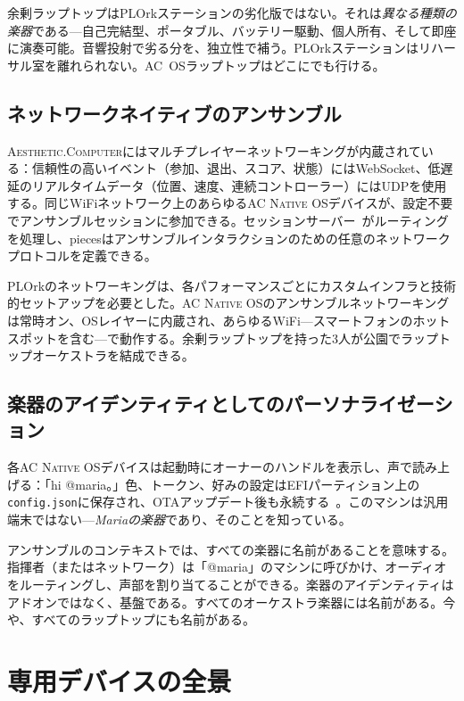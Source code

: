 \documentclass[10pt,letterpaper,twocolumn]{article}
\newcommand{\ac}{\textsc{Aesthetic.Computer}}
\newcommand{\acos}{\textsc{AC Native OS}}
\begin{document}
余剰ラップトップはPLOrkステーションの劣化版ではない。それは\emph{異なる種類の楽器}である---自己完結型、ポータブル、バッテリー駆動、個人所有、そして即座に演奏可能。音響投射で劣る分を、独立性で補う。PLOrkステーションはリハーサル室を離れられない。AC~OSラップトップはどこにでも行ける。

\subsection{ネットワークネイティブのアンサンブル}

\ac{}にはマルチプレイヤーネットワーキングが内蔵されている：信頼性の高いイベント（参加、退出、スコア、状態）にはWebSocket、低遅延のリアルタイムデータ（位置、速度、連続コントローラー）にはUDPを使用する。同じWiFiネットワーク上のあらゆる\acos{}デバイスが、設定不要でアンサンブルセッションに参加できる。セッションサーバー~\citep{scudder2026ac}がルーティングを処理し、piecesはアンサンブルインタラクションのための任意のネットワークプロトコルを定義できる。

PLOrkのネットワーキングは、各パフォーマンスごとにカスタムインフラと技術的セットアップを必要とした。\acos{}のアンサンブルネットワーキングは常時オン、OSレイヤーに内蔵され、あらゆるWiFi---スマートフォンのホットスポットを含む---で動作する。余剰ラップトップを持った3人が公園でラップトップオーケストラを結成できる。

\subsection{楽器のアイデンティティとしてのパーソナライゼーション}

各\acos{}デバイスは起動時にオーナーのハンドルを表示し、声で読み上げる：「hi @maria。」色、トークン、好みの設定はEFIパーティション上の\texttt{config.json}に保存され、OTAアップデート後も永続する~\citep{scudder2026os}。このマシンは汎用端末ではない---\emph{Mariaの楽器}であり、そのことを知っている。

アンサンブルのコンテキストでは、すべての楽器に名前があることを意味する。指揮者（またはネットワーク）は「@maria」のマシンに呼びかけ、オーディオをルーティングし、声部を割り当てることができる。楽器のアイデンティティはアドオンではなく、基盤である。すべてのオーケストラ楽器には名前がある。今や、すべてのラップトップにも名前がある。


\section{専用デバイスの全景}
\label{sec:devices}
\end{document}
